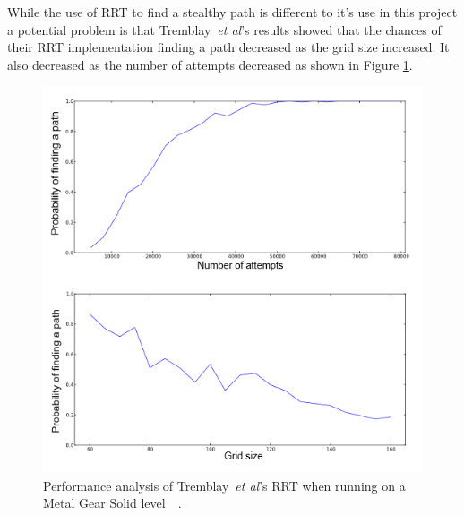 \documentclass[journal]{IEEEtran}
\begin{document}
While the use of RRT to find a stealthy path is different to it's use in this project a potential problem is that Tremblay~\textit{et al}'s results showed that the chances of their RRT implementation finding a path decreased as the grid size increased. It also decreased as the number of attempts decreased as shown in Figure \ref{TremblayRRT}. 


\begin{figure}[h]
	\includegraphics[width=1.0\linewidth]{Tremblay2013.png}
	\caption{ Performance analysis of Tremblay~\textit{et al}'s RRT when running on a Metal Gear Solid level~\cite{Tremblay2013}~\cite{game:MetalGearSolid}.}
	\label{TremblayRRT}
\end{figure} 
\end{document}
